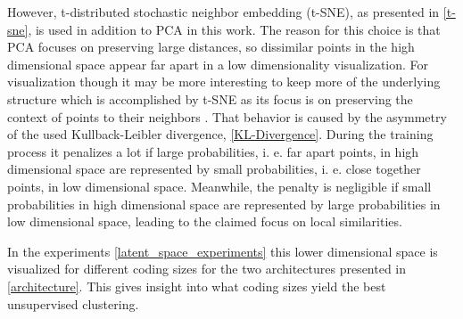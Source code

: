 However,
t-distributed stochastic neighbor embedding (t-SNE), as presented in \autoref{t-sne}, is used in addition
to PCA in this work.
The reason for this choice is that PCA focuses on preserving large distances, so dissimilar points in the
high dimensional space appear far apart in a low dimensionality visualization. For visualization though
it may be more interesting to keep more of the underlying structure which is accomplished by t-SNE as its
focus is on preserving the context of points to their neighbors \parencite{2008-vanDerMaaten-visualizing}.
That behavior is caused by the asymmetry of the used Kullback-Leibler divergence, \autoref{KL-Divergence}.
During the training process it penalizes a lot if large probabilities, i. e. far apart points, in high dimensional
space are represented by small probabilities, i. e. close together points, in low dimensional space. Meanwhile, the 
penalty is negligible if small probabilities in high dimensional space are represented by large probabilities in
low dimensional space, leading to the claimed focus on local similarities.

In the experiments \autoref{latent_space_experiments} this lower dimensional space is visualized
for different coding sizes for the two architectures presented in \autoref{architecture}.
This gives insight into what coding sizes yield the best unsupervised clustering.

